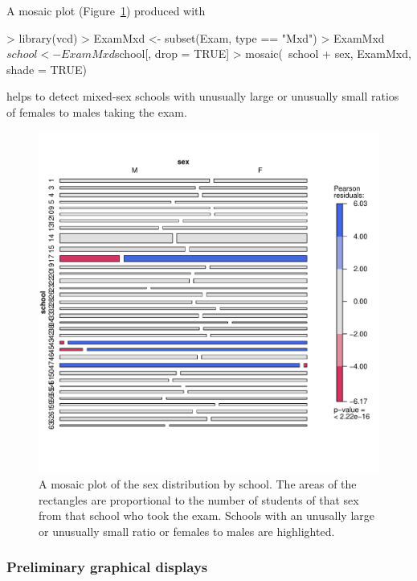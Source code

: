 \documentclass[12pt]{article}
\begin{document}
A mosaic plot (Figure~\ref{fig:ExamMosaic}) produced with
\begin{Schunk}
\begin{Sinput}
> library(vcd)
> ExamMxd <- subset(Exam, type == "Mxd")
> ExamMxd$school <- ExamMxd$school[, drop = TRUE]
> mosaic(~school + sex, ExamMxd, shade = TRUE)
\end{Sinput}
\end{Schunk}
helps to detect mixed-sex schools with unusually large or unusually small ratios
of females to males taking the exam.
\begin{figure}[tbp]
  \centering
  \includegraphics[width=\textwidth]{figs/SoftRev-ExamMosaic}
  \caption{A mosaic plot of the sex distribution by school.  The areas
    of the rectangles are proportional to the number of students of
    that sex from that school who took the exam.  Schools with an
    unusally large or unusually small ratio or females to males are
    highlighted.}
  \label{fig:ExamMosaic}
\end{figure}

\subsubsection{Preliminary graphical displays}
\label{sec:Graphical}
\end{document}
